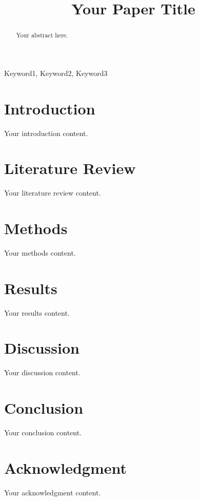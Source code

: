 \documentclass[conference]{IEEEtran}
\begin{document}
\title{Your Paper Title}

\author{
\and
{}
}

\maketitle

\begin{abstract}
Your abstract here.
\end{abstract}

\begin{IEEEkeywords}
Keyword1, Keyword2, Keyword3
\end{IEEEkeywords}

\section{Introduction}
Your introduction content.

\section{Literature Review}
Your literature review content.

\section{Methods}
Your methods content.

\section{Results}
Your results content.

\section{Discussion}
Your discussion content.

\section{Conclusion}
Your conclusion content.

\section*{Acknowledgment}
Your acknowledgment content.



\end{document}

